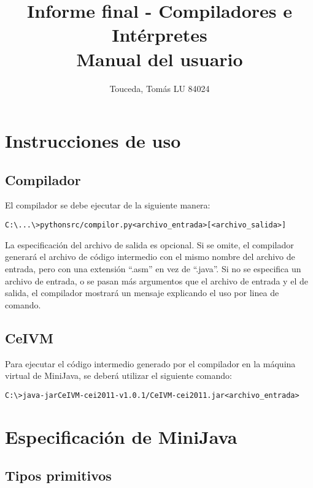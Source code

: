 \documentclass [a4paper,abstracton,titlepage]{scrartcl}
\title{Informe final - Compiladores e Intérpretes\\Manual del usuario}
\author{Touceda, Tomás LU 84024}
\begin{document}
\maketitle

\tableofcontents

\newpage

\hypertarget{_especificación_e_instrucciones_de_uso}{}
\section{Instrucciones de uso}

\subsection{Compilador}

El compilador se debe ejecutar de la siguiente manera:

\begin{alltt}C:\textbackslash{}...\textbackslash{}\textgreater{} python src/compilor.py \textless{}archivo\_{}entrada\textgreater{} [\textless{}archivo\_{}salida\textgreater{}]\end{alltt}

La especificación del archivo de salida es opcional.
Si se omite, el compilador generará el archivo de código intermedio con el mismo nombre del archivo de entrada, pero con una extensión ``.asm'' en vez de ``.java''.
Si no se especifica un archivo de entrada, o se pasan más argumentos que el
archivo de entrada y el de salida, el compilador mostrará un mensaje
explicando el uso por linea de comando.

\subsection{CeIVM}

Para ejecutar el código intermedio generado por el compilador en la máquina virtual de MiniJava, se deberá utilizar el siguiente comando:

\begin{alltt}C:\textbackslash{}\textgreater{} java -jar CeIVM-cei2011-v1.0.1/CeIVM-cei2011.jar \textless{}archivo\_{}entrada\textgreater{}\end{alltt}

\section{Especificación de MiniJava}

\subsection{Tipos primitivos}
\end{document}
